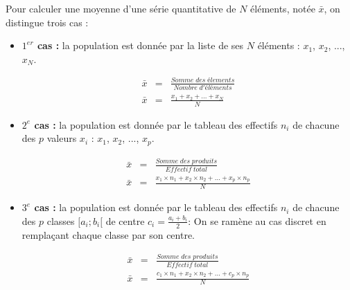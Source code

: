 \documentclass[12pt,a4paper]{article}
\begin{document}
  	\begin{mybilan}
  		  		
  		Pour calculer une moyenne d'une série quantitative de $N$ éléments, notée $\bar{x}$, on distingue trois cas :
  		
  		\begin{itemize}
  			\item \textbf{$1^{er}$ cas :} la population est donnée par la liste de ses $N$ éléments : $x_1$, $x_2$, ..., $x_N$.
  			
  			\begin{eqnarray*}
  				\bar{x} &= & \frac{Somme\; des \; élements}{Nombre\; d'éléments}\\
  				\bar{x} &= & \frac{x_1 + x_2 + ... + x_N}{N}
  			\end{eqnarray*}
  		
  			\item \textbf{$2^{e}$ cas :} la population est donnée par le tableau des effectifs $n_i$ de chacune des $p$ valeurs $x_i$ : $x_1$, $x_2$, ..., $x_p$.
  			
  			\begin{eqnarray*}
  				\bar{x} &= & \frac{Somme\; des \; produits}{Effectif\; total}\\
  				\bar{x} &= & \frac{x_1 \times n_1 + x_2 \times n_2 + ... + x_p \times n_p}{N}
  			\end{eqnarray*}
  		
  			\item \textbf{$3^{e}$ cas :} la population est donnée par le tableau des effectifs $n_i$ de chacune des $p$ classes $[a_i; b_i[$ de centre $c_i = \frac{a_i +  b_i}{2} $: On se ramène au cas discret en remplaçant chaque classe par son centre.
  			
  			\begin{eqnarray*}
  				\bar{x} &= & \frac{Somme\; des \; produits}{Effectif\; total}\\
  				\bar{x} &= & \frac{c_1 \times n _1 + x_2 \times n_2 + ... + c_p \times n_p}{N}
  			\end{eqnarray*}
  		
  		\end{itemize}
  	\end{mybilan}
\end{document}
